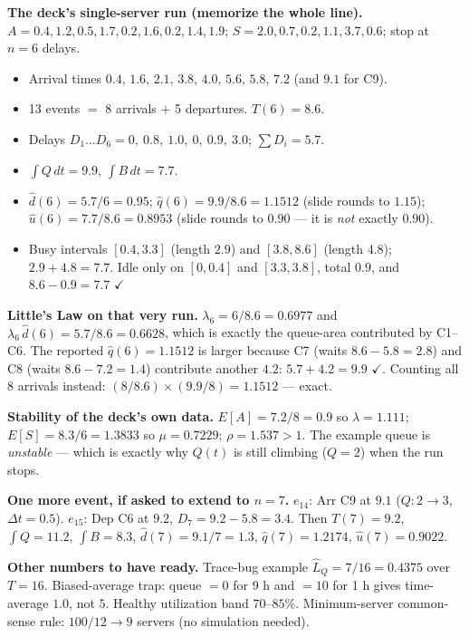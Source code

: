 \begin{numbox}
\textbf{The deck's single-server run (memorize the whole line).} $A=0.4,1.2,0.5,1.7,0.2,1.6,0.2,1.4,1.9$; $S=2.0,0.7,0.2,1.1,3.7,0.6$; stop at $n=6$ delays.
\begin{itemize}
\item Arrival times $0.4,\,1.6,\,2.1,\,3.8,\,4.0,\,5.6,\,5.8,\,7.2$ (and $9.1$ for C9).
\item 13 events $=$ 8 arrivals $+$ 5 departures. $T(6)=8.6$.
\item Delays $D_1\ldots D_6 = 0,\ 0.8,\ 1.0,\ 0,\ 0.9,\ 3.0$; $\sum D_i = 5.7$.
\item $\int Q\,dt = 9.9$, $\int B\,dt = 7.7$.
\item $\hat d(6)=5.7/6=\mathbf{0.95}$; $\hat q(6)=9.9/8.6=\mathbf{1.1512}$ (slide rounds to $1.15$); $\hat u(6)=7.7/8.6=\mathbf{0.8953}$ (slide rounds to $0.90$ --- it is \emph{not} exactly $0.90$).
\item Busy intervals $[0.4,3.3]$ (length $2.9$) and $[3.8,8.6]$ (length $4.8$); $2.9+4.8=7.7$. Idle only on $[0,0.4]$ and $[3.3,3.8]$, total $0.9$, and $8.6-0.9=7.7$ $\checkmark$
\end{itemize}
\textbf{Little's Law on that very run.} $\lambda_6 = 6/8.6 = 0.6977$ and $\lambda_6\,\hat d(6) = 5.7/8.6 = \mathbf{0.6628}$, which is exactly the queue-area contributed by C1--C6. The reported $\hat q(6)=1.1512$ is larger because C7 (waits $8.6-5.8=2.8$) and C8 (waits $8.6-7.2=1.4$) contribute another $4.2$: $5.7+4.2 = 9.9$ $\checkmark$. Counting all 8 arrivals instead: $(8/8.6)\times(9.9/8) = 1.1512$ --- exact.

\smallskip
\textbf{Stability of the deck's own data.} $E[A] = 7.2/8 = 0.9$ so $\lambda = 1.111$; $E[S] = 8.3/6 = 1.3833$ so $\mu = 0.7229$; $\rho = 1.537 > 1$. The example queue is \emph{unstable} --- which is exactly why $Q(t)$ is still climbing ($Q=2$) when the run stops.

\smallskip
\textbf{One more event, if asked to extend to $n=7$.} $e_{14}$: Arr C9 at $9.1$ ($Q: 2\to3$, $\Delta t = 0.5$). $e_{15}$: Dep C6 at $9.2$, $D_7 = 9.2-5.8 = 3.4$. Then $T(7)=9.2$, $\int Q = 11.2$, $\int B = 8.3$, $\hat d(7)=9.1/7=1.3$, $\hat q(7)=1.2174$, $\hat u(7)=0.9022$.

\smallskip
\textbf{Other numbers to have ready.} Trace-bug example $\hat L_Q = 7/16 = 0.4375$ over $T=16$. Biased-average trap: queue $=0$ for 9 h and $=10$ for 1 h gives time-average $\mathbf{1.0}$, not $5$. Healthy utilization band $70$--$85\%$. Minimum-server common-sense rule: $100/12 \to 9$ servers (no simulation needed).
\end{numbox}

